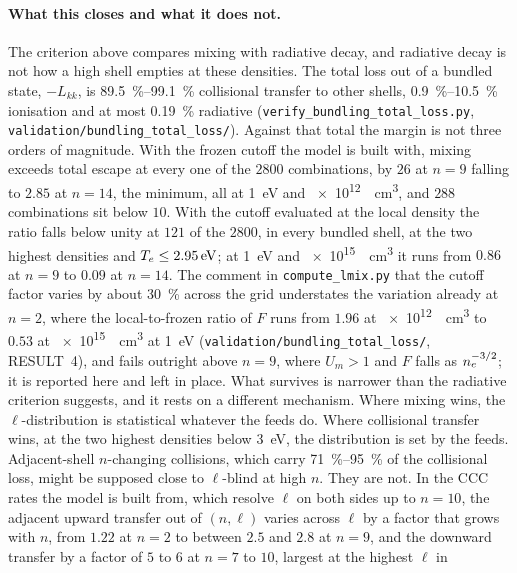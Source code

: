 \paragraph{What this closes and what it does not.} The criterion above compares
mixing with radiative decay, and radiative decay is not how a high shell
empties at these densities. The total loss out of a bundled state, $-L_{kk}$,
is \SIrange{89.5}{99.1}{\percent} collisional transfer to other shells,
\SIrange{0.9}{10.5}{\percent} ionisation and at most \SI{0.19}{\percent}
radiative (\texttt{verify\_bundling\_total\_loss.py},
\texttt{validation/bundling\_total\_loss/}). Against that total the margin is
not three orders of magnitude. With the frozen cutoff the model is built with,
mixing exceeds total escape at every one of the $2800$ combinations, by $26$
at $n=9$ falling to $2.85$ at $n=14$, the minimum, all at
\SI{1}{\electronvolt} and \SI{e12}{\per\cubic\centi\metre}, and $288$
combinations sit below $10$. With the cutoff evaluated at the local density
the ratio falls below unity at $121$ of the $2800$, in every bundled shell, at
the two highest densities and $T_e \le \SI{2.95}{\electronvolt}$; at
\SI{1}{\electronvolt} and \SI{e15}{\per\cubic\centi\metre} it runs from $0.86$
at $n=9$ to $0.09$ at $n=14$. The comment in \texttt{compute\_lmix.py} that the
cutoff factor varies by about \SI{30}{\percent} across the grid understates the
variation already at $n=2$, where the local-to-frozen ratio of $F$ runs from
$1.96$ at \SI{e12}{\per\cubic\centi\metre} to $0.53$ at
\SI{e15}{\per\cubic\centi\metre} at \SI{1}{\electronvolt}
(\texttt{validation/bundling\_total\_loss/}, RESULT~4), and fails outright
above $n=9$, where $U_m > 1$ and $F$ falls as $n_e^{-3/2}$; it is reported
here and left in place. What survives is narrower than the radiative
criterion suggests, and it rests on a different mechanism. Where mixing wins,
the $\ell$-distribution is statistical whatever the feeds do. Where collisional
transfer wins, at the two highest densities below \SI{3}{\electronvolt}, the
distribution is set by the feeds. Adjacent-shell $n$-changing collisions, which
carry \SIrange{71}{95}{\percent} of the collisional loss, might be supposed
close to $\ell$-blind at high $n$. They are not. In the CCC rates the model is built from, which
resolve $\ell$ on both sides up to $n = 10$, the adjacent upward transfer out
of $(n,\ell)$ varies across $\ell$ by a factor that grows with $n$, from $1.22$
at $n = 2$ to between $2.5$ and $2.8$ at $n = 9$, and the downward transfer by
a factor of $5$ to $6$ at $n = 7$ to $10$, largest at the highest $\ell$ in
